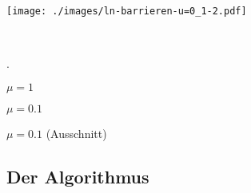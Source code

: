 	\hspace{0.1cm}
	\begin{minipage}[t]{6.0cm}	
\texttt{[image: ./images/ln-barrieren-u=0\_1-2.pdf]}
\end{minipage}
\\
\begin{minipage}[t]{1cm}
.
	\end{minipage}
\begin{minipage}[t]{6.0cm}
       $\mu = 1$
	\end{minipage}
	\hspace{0.1cm}
	\begin{minipage}[t]{6.0cm}	
			$\mu = 0.1$
	\end{minipage}
	\hspace{0.1cm}
	\begin{minipage}[t]{4.0cm}	
			$\mu = 0.1$ (Ausschnitt)
\end{minipage}


\newpage
\subsection{Der Algorithmus}


